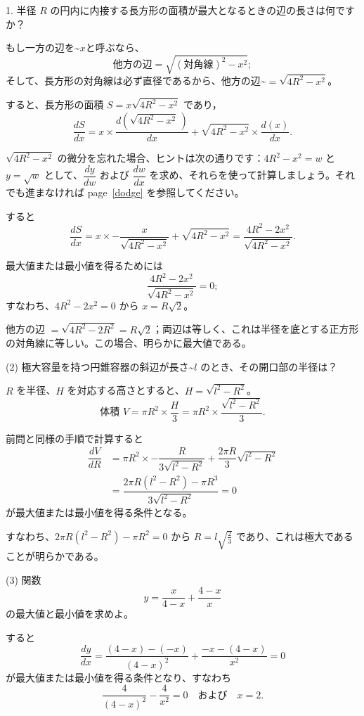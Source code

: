 \documentclass[a4paper,11pt,openany]{ltjsbook}
\newcommand{\Pageref}[2][p.]{#1~\ref{#2}}
\begin{document}
1. 半径 \( R \) の円内に内接する長方形の面積が最大となるときの辺の長さは何ですか？

もし一方の辺を\textasciitilde{}$x$と呼ぶなら、
\[
\text{他方の辺} = \sqrt{(\text{対角線})^2 - x^2};
\]
そして、長方形の対角線は必ず直径であるから、他方の辺\textasciitilde{}$= \sqrt{4R^2 - x^2}$。

すると、長方形の面積 $S = x\sqrt{4R^2 - x^2}$ であり，
\[
\dfrac{dS}{dx} = x \times  \dfrac{d\left(\sqrt{4R^2 - x^2}\,\right)}{dx} + \sqrt{4R^2 - x^2} \times  \dfrac{d(x)}{dx}.
\]

$\sqrt{4R^2-x^2}$ の微分を忘れた場合、ヒントは次の通りです：$4R^2-x^2=w$ と $y=\sqrt{w}$ として、$\dfrac{dy}{dw}$ および $\dfrac{dw}{dx}$ を求め、それらを使って計算しましょう。それでも進まなければ \Pageref[page]{dodge} を参照してください。

すると
\[
\dfrac{dS}{dx}
  = x \times  -\dfrac{x}{\sqrt{4R^2 - x^2}} + \sqrt{4R^2 - x^2}
  = \dfrac{4R^2 - 2x^2}{\sqrt{4R^2 - x^2}}.
\]

最大値または最小値を得るためには
\[
\dfrac{4R^2 - 2x^2}{\sqrt{4R^2 - x^2}} = 0;
\]
すなわち、$4R^2 - 2x^2 = 0$ から $x = R\sqrt{2}$。

他方の辺 ${} = \sqrt{4R^2 - 2R^2} = R\sqrt{2}$；両辺は等しく、これは半径を底とする正方形の対角線に等しい。この場合、明らかに最大値である。

(2) 極大容量を持つ円錐容器の斜辺が長さ\textasciitilde{}$l$ のとき、その開口部の半径は？

$R$ を半径、$H$ を対応する高さとすると、$H = \sqrt{l^2 - R^2}$。
\[
\text{体積 } V = \pi R^2 \times  \dfrac{H}{3} = \pi R^2 \times  \dfrac{\sqrt{l^2 - R^2}}{3}.
\]

前問と同様の手順で計算すると
\begin{align*}
\dfrac{dV}{dR}
  &= \pi R^2 \times  -\dfrac{R}{3\sqrt{l^2 - R^2}} + \dfrac{2\pi R}{3} \sqrt{l^2 - R^2} \\
  &= \dfrac{2\pi R(l^2 - R^2) - \pi R^3}{3\sqrt{l^2 - R^2}} = 0
\end{align*}
が最大値または最小値を得る条件となる。

すなわち、$2\pi R(l^2 - R^2) - \pi R^2 = 0$ から $R = l\sqrt{\tfrac{2}{3}}$ であり、これは極大であることが明らかである。

(3) 関数
\[
y = \dfrac{x}{4-x} + \dfrac{4-x}{x}
\]
の最大値と最小値を求めよ。

すると
\[
\dfrac{dy}{dx} = \dfrac{(4-x)-(-x)}{(4-x)^2} + \dfrac{-x - (4-x)}{x^2} = 0
\]
が最大値または最小値を得る条件となり、すなわち
\[
\dfrac{4}{(4-x)^2} - \dfrac{4}{x^2} = 0 \quad\text{および}\quad x = 2.
\]
\end{document}
